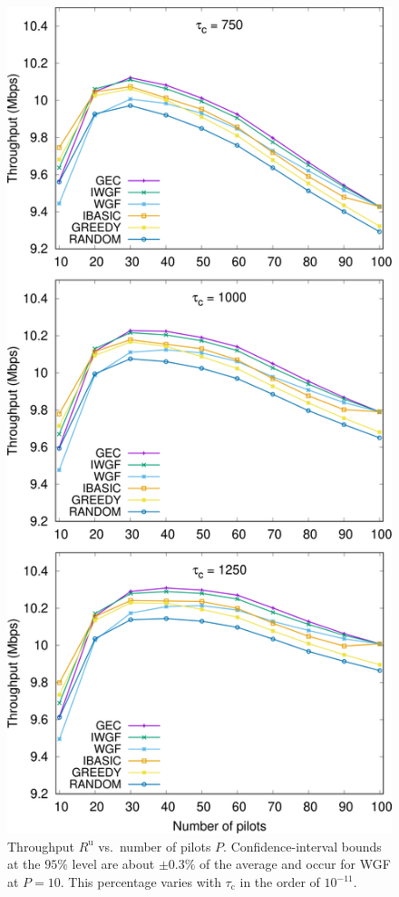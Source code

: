 \documentclass[]{IEEEtran}
\begin{document}
\begin{figure}[t]
\centering
\includegraphics[scale=0.6915]{rate.png}
\caption{Throughput $R^\mathrm{u}$ vs.\ number of pilots $P$.
Confidence-interval bounds at the $95\%$ level are about $\pm 0.3\%$ of the
average and occur for WGF at $P=10$. This percentage varies with
$\tau_\mathrm{c}$ in the order of $10^{-11}$.}
\label{figrate}
\end{figure}
\end{document}

